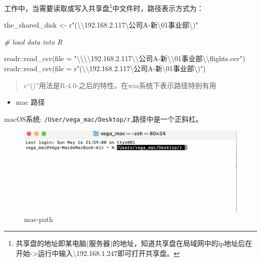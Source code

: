 \documentclass[
]{book}
\newenvironment{Shaded}{\begin{snugshade}}{\end{snugshade}}
\newcommand{\AttributeTok}[1]{\textcolor[rgb]{0.77,0.63,0.00}{#1}}
\newcommand{\CommentTok}[1]{\textcolor[rgb]{0.56,0.35,0.01}{\textit{#1}}}
\newcommand{\FunctionTok}[1]{\textcolor[rgb]{0.00,0.00,0.00}{#1}}
\newcommand{\NormalTok}[1]{#1}
\newcommand{\OtherTok}[1]{\textcolor[rgb]{0.56,0.35,0.01}{#1}}
\newcommand{\SpecialCharTok}[1]{\textcolor[rgb]{0.00,0.00,0.00}{#1}}
\newcommand{\StringTok}[1]{\textcolor[rgb]{0.31,0.60,0.02}{#1}}
\providecommand{\tightlist}{%
  \setlength{\itemsep}{0pt}\setlength{\parskip}{0pt}}
\begin{document}
工作中，当需要读取或写入共享盘\footnote{共享盘的地址即某电脑(服务器)的地址，知道共享盘在局域网中的ip地址后在 开始-\textgreater 运行中输入\textbackslash192.168.1.247即可打开共享盘。}中文件时，路径表示方式为：

\begin{Shaded}
\begin{Highlighting}[]
\NormalTok{the\_shared\_disk }\OtherTok{\textless{}{-}}\NormalTok{ r}\StringTok{"(}\SpecialCharTok{\textbackslash{}\textbackslash{}}\StringTok{192.168.2.117\textbackslash{}公司A{-}新}\SpecialCharTok{\textbackslash{}01}\StringTok{事业部\textbackslash{})"}

\CommentTok{\# load data into R}

\NormalTok{readr}\SpecialCharTok{::}\FunctionTok{read\_csv}\NormalTok{(}\AttributeTok{file =} \StringTok{"}\SpecialCharTok{\textbackslash{}\textbackslash{}\textbackslash{}\textbackslash{}}\StringTok{192.168.2.117}\SpecialCharTok{\textbackslash{}\textbackslash{}}\StringTok{公司A{-}新}\SpecialCharTok{\textbackslash{}\textbackslash{}}\StringTok{01事业部}\SpecialCharTok{\textbackslash{}\textbackslash{}}\StringTok{flights.csv"}\NormalTok{)}
\NormalTok{readr}\SpecialCharTok{::}\FunctionTok{read\_csv}\NormalTok{(}\AttributeTok{file =}\NormalTok{ r}\StringTok{"(}\SpecialCharTok{\textbackslash{}\textbackslash{}}\StringTok{192.168.2.117\textbackslash{}公司A{-}新}\SpecialCharTok{\textbackslash{}01}\StringTok{事业部\textbackslash{})"}\NormalTok{)}
\end{Highlighting}
\end{Shaded}

\begin{quote}
r``()''用法是R-4.0-之后的特性。在win系统下表示路径特别有用
\end{quote}

\begin{itemize}
\tightlist
\item
  mac 路径
\end{itemize}

macOS系统: \texttt{/User/vega\_mac/Desktop/r},路径中是一个正斜杠。

\begin{figure}
\centering
\includegraphics{picture/read-write/mac-path.png}
\caption{mac-path}
\end{figure}
\end{document}
